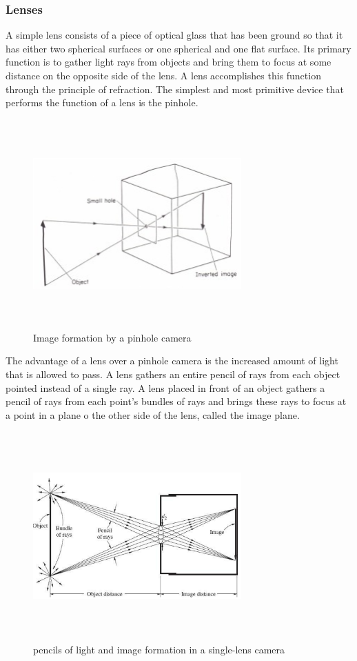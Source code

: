 \subsubsection{Lenses}
A simple lens consists of a piece of optical glass that has been ground so that it has either two spherical surfaces or one spherical and one flat surface. Its primary function is to gather light rays from objects and bring them to focus at some distance on the opposite side of the lens. A lens accomplishes this function through the principle of refraction. The simplest and most primitive device that performs the function of a lens is the pinhole.\cite{elements_photogrammetry}
\begin{figure}[H]
\centering
\includegraphics[width=8cm,height=8cm,keepaspectratio]{imagenes/pinhole.PNG}
\caption{Image formation by a pinhole camera }
\label{fig:pinhole}
\end{figure}
The advantage of a lens over a pinhole camera is the increased amount of light that is allowed to pass. A lens gathers an entire pencil of rays from each object pointed instead of a single ray. A lens placed in front of an object gathers a pencil of rays from each point's bundles of rays and brings these rays to focus at a point in a plane o the other side of the lens, called the image plane\cite{elements_photogrammetry}.
\begin{figure}[H]
\centering
\includegraphics[width=8cm,height=8cm,keepaspectratio]{imagenes/lens.PNG}
\caption{pencils of light and image formation in a single-lens camera}
\label{fig:lens}
\end{figure}
